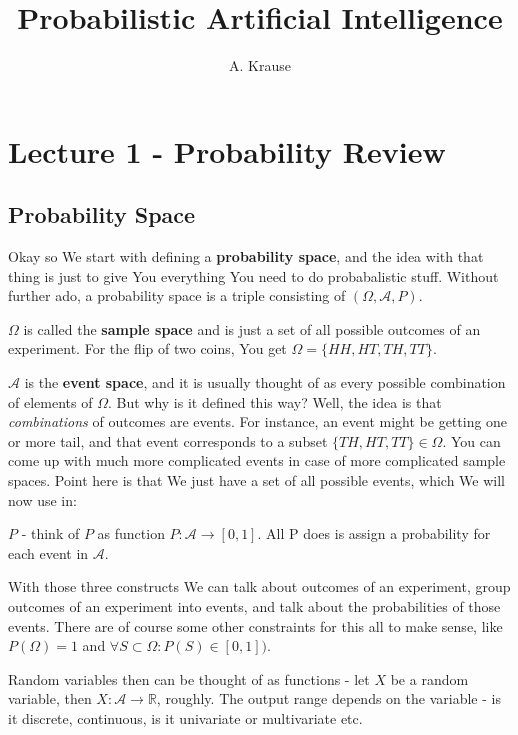 \documentclass{article}
\begin{document}
\title{Probabilistic Artificial Intelligence}
\author{A. Krause}
\date{}

\maketitle

\section{Lecture 1 - Probability Review}

	\subsection{Probability Space}

		Okay so We start with defining a \textbf{probability space}, and the idea with that thing is just to give You everything You need to do probabalistic stuff. Without further ado, a probability space is a triple consisting of $(\Omega, \mathcal{A}, P)$.
		
		$\Omega$ is called the \textbf{sample space} and is just a set of all possible outcomes of an experiment. For the flip of two coins, You get $\Omega = \{HH, HT, TH, TT \}$.
		
		$\mathcal{A}$ is the \textbf{event space}, and it is usually thought of as every possible combination of elements of $\Omega$. But why is it defined this way? Well, the idea is that \textit{combinations} of outcomes are events. For instance, an event might be getting one or more  tail, and that event corresponds to a subset $\{TH, HT, TT \}\in\Omega$. You can come up with much more complicated events in case of more complicated sample spaces. Point here is that We just have a set of all possible events, which We will now use in:
		
		$P$ - think of $P$ as function $P:\mathcal{A}\to[0, 1]$. All P does is assign a probability for each event in $\mathcal{A}$. 
		
		With those three constructs We can talk about outcomes of an experiment, group outcomes of an experiment into events, and talk about the probabilities of those events. There are of course some other constraints for this all to make sense, like $P(\Omega)=1$ and $\forall S\subset\Omega: P(S)\in[0, 1])$.
		
		Random variables then can be thought of as functions - let $X$ be a random variable, then $X:\mathcal{A}\to\mathbb{R}$, roughly. The output range depends on the variable - is it discrete, continuous, is it univariate or multivariate etc.
		
\end{document}
